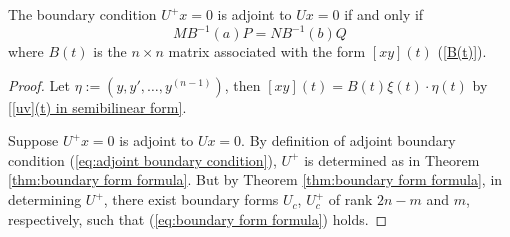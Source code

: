 \documentclass[11pt, oneside, a4paper]{article}
\begin{document}
\begin{thm}\label{thm:condition iff adjoint}
    The boundary condition $U^+x=0$ is adjoint to $Ux=0$ if and only if
    \begin{equation}\label{eq:condition iff adjoint}
        MB^{-1}(a)P = NB^{-1}(b)Q
    \end{equation}
    where $B(t)$ is the $n\times n$ matrix associated with the form $[xy](t)$ (\eqref{B(t)}).
\end{thm}
\begin{proof}
    Let $\eta := (y, y', \ldots, y^{(n-1)})$,
    then $[xy](t)=B(t)\xi(t)\cdot \eta(t)$ by \eqref{[uv](t) in semibilinear form}.

    Suppose $U^+x=0$ is adjoint to $Ux=0$. By definition of adjoint boundary condition (\ref{eq:adjoint boundary condition}), $U^+$ is determined as in Theorem \ref{thm:boundary form formula}. But by Theorem \ref{thm:boundary form formula}, in determining $U^+$, there exist boundary forms $U_c$, $U_c^+$ of rank $2n-m$ and $m$, respectively, such that (\ref{eq:boundary form formula}) holds. 


\end{proof}
\end{document}

